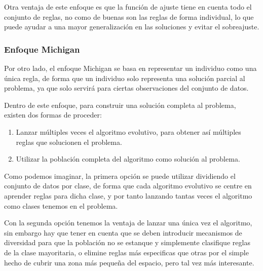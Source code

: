 Otra ventaja de este enfoque es que la función de ajuste tiene en cuenta todo el conjunto de reglas, no como de buenas son las reglas de forma individual, lo que puede ayudar a una mayor generalización en las soluciones y evitar el sobreajuste.

\subsubsection{Enfoque Michigan}

Por otro lado, el enfoque Michigan se basa en representar un individuo como una única regla, de forma que un individuo solo representa una solución parcial al problema, ya que solo servirá para ciertas observaciones del conjunto de datos.

Dentro de este enfoque, para construir una solución completa al problema, existen dos formas de proceder:

\begin{enumerate}
	\item Lanzar múltiples veces el algoritmo evolutivo, para obtener así múltiples reglas que solucionen el problema.
	\item Utilizar la población completa del algoritmo como solución al problema.
\end{enumerate}

Como podemos imaginar, la primera opción se puede utilizar dividiendo el conjunto de datos por clase, de forma que cada algoritmo evolutivo se centre en aprender reglas para dicha clase, y por tanto lanzando tantas veces el algoritmo como clases tenemos en el problema.

Con la segunda opción tenemos la ventaja de lanzar una única vez el algoritmo, sin embargo hay que tener en cuenta que se deben introducir mecanismos de diversidad para que la población no se estanque y simplemente clasifique reglas de la clase mayoritaria, o elimine reglas más especificas que otras por el simple hecho de cubrir una zona más pequeña del espacio, pero tal vez más interesante.



\newpage

